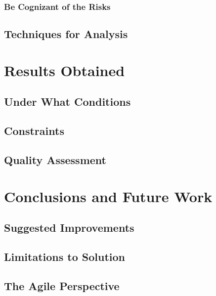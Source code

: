 \documentclass[a4paper,12pt]{report}
\begin{document}
\subsection{Be Cognizant of the Risks}
\section{Techniques for Analysis}

\chapter{Results Obtained}
\section{Under What Conditions}
\section{Constraints}
\section{Quality Assessment}

\chapter{Conclusions and Future Work}
\section{Suggested Improvements}
\section{Limitations to Solution}
\section{The Agile Perspective}
\end{document}

